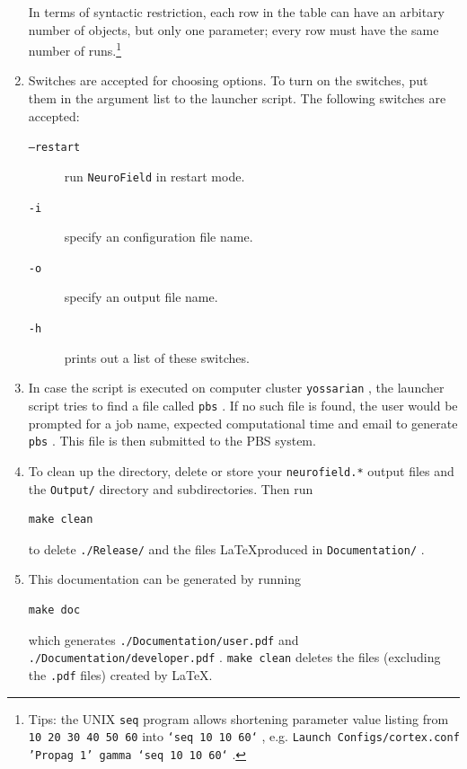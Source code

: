 \documentclass[12pt,a4paper]{article}
\newcommand{\type}[1]{ {\small\small\tt #1} }
\newcommand{\NF}[0]{ \type{NeuroField}}
\begin{document}
\begin{enumerate}
In terms of syntactic restriction, each row in the table can have an arbitary number of objects, but only one parameter; every row must have the same number of runs.\footnote{Tips: the UNIX \type{seq} program allows shortening parameter value listing from \type{10 20 30 40 50 60} into \type{`seq 10 10 60`}, e.g. \type{Launch Configs/cortex.conf 'Propag 1' gamma `seq 10 10 60`}.}

\item Switches are accepted for choosing options. To turn on the switches, put them in the argument list to the launcher script. The following switches are accepted:
	\begin{description}
	\item[\type{--restart}] run \NF in restart mode.
	\item[\type{-i}] specify an configuration file name.
	\item[\type{-o}] specify an output file name.
	\item[\type{-h}] prints out a list of these switches.
	\end{description}

\item In case the script is executed on computer cluster \type{yossarian}, the launcher script tries to find a file called \type{pbs}. If no such file is found, the user would be prompted for a job name, expected computational time and email to generate \type{pbs}. This file is then submitted to the PBS system.

\item To clean up the directory, delete or store your \type{neurofield.*} output files and the \type{Output/} directory and subdirectories. Then run
\begin{lstlisting}
make clean
\end{lstlisting}
to delete \type{./Release/} and the files \LaTeX produced in \type{Documentation/}.

\item This documentation can be generated by running 
\begin{lstlisting}
make doc
\end{lstlisting}
which generates \type{./Documentation/user.pdf} and \type{./Documentation/developer.pdf}. \type{make clean} deletes the files (excluding the \type{.pdf} files) created by \LaTeX.

\end{enumerate}
\end{document}
